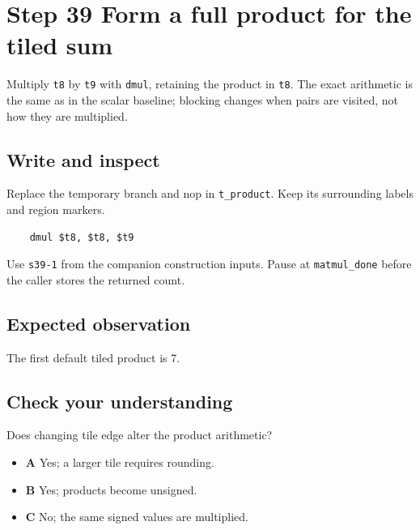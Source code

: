 \section{Step 39 Form a full product for the tiled sum}\label{matmul-s39}

Multiply \texttt{t8} by \texttt{t9} with \texttt{dmul}, retaining the product in \texttt{t8}. The exact arithmetic is the same as in the scalar baseline; blocking changes when pairs are visited, not how they are multiplied.

\subsection{Write and inspect}
Replace the temporary branch and nop in \texttt{t\_product}. Keep its surrounding labels and region markers.

\begin{verbatim}
    dmul $t8, $t8, $t9
\end{verbatim}
Use \texttt{s39-1} from the companion construction inputs. Pause at \texttt{matmul\_done} before the caller stores the returned count.

\subsection{Expected observation}
The first default tiled product is 7.

\subsection{Check your understanding}
Does changing tile edge alter the product arithmetic?

\begin{itemize}
  \item \textbf{A} Yes; a larger tile requires rounding.
  \item \textbf{B} Yes; products become unsigned.
  \item \textbf{C} No; the same signed values are multiplied.
\end{itemize}
